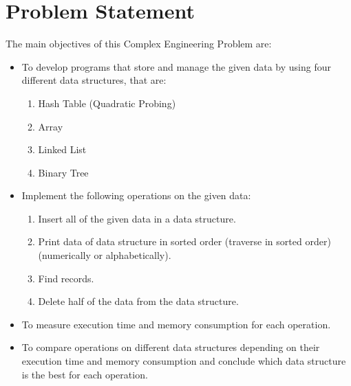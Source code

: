 
\chapter{Problem Statement} %
\label{Chapter1}
The main objectives of this Complex Engineering Problem are:
\begin{itemize}
	\item To develop programs that store and manage the given data by using four different data structures, that are:
		\begin{enumerate}
			\item Hash Table (Quadratic Probing)
			\item Array
			\item Linked List
			\item Binary Tree
		\end{enumerate}
	\item Implement the following operations on the given data:
		\begin{enumerate}
			\item Insert all of the given data in a data structure.
			\item Print data of data structure in sorted order (traverse in sorted order) (numerically or alphabetically).
			\item Find records.
			\item Delete half of the data from the data structure.			
		\end{enumerate}
	\item To measure execution time and memory consumption for each operation.
	\item To compare operations on different data structures depending on their execution time and memory consumption and conclude which data structure is the best for each operation.
\end{itemize}



